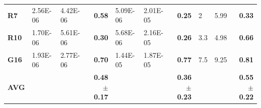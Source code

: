\documentclass[encoding=utf8,british]{tumphthesis}
\begin{document}
\begin{table}[H]
\begin{subtable}{1\textwidth}
{\begin{tabular}{|l|llr|llr|llr|}
\rowcolor[HTML]{CFE2F3} 
\textbf{R7}                               & 2.56E-06                                             & 4.42E-06                                              & \textbf{0.58}                                    & 5.09E-06                                           & 2.01E-05                                              & \textbf{0.25}                                    & 2                                                    & 5.99                                                  & \textbf{0.33}                                    \\
\textbf{R10}                              & 1.70E-06                                             & 5.61E-06                                              & \textbf{0.30}                                    & 5.68E-06                                             & 2.16E-05                                              & \textbf{0.26}                                    & 3.3                                                  & 4.98                                                  & \textbf{0.66}                                    \\
\rowcolor[HTML]{CFE2F3} 
\textbf{G16}                              & 1.93E-06                                             & 2.77E-06                                              & \textbf{0.70}                                    & 1.44E-05                                             & 1.87E-05                                              & \textbf{0.77}                                    & 7.5                                                  & 9.25                                                  & \textbf{0.81}                                    \\ \hline
\textbf{AVG}                             &                                                      &                                                       & \textbf{0.48$\pm$0.17}                           &                                                      &                                                       & \textbf{0.36$\pm$0.23}                           &                                                      &                                                       & \textbf{0.55$\pm$0.22}                          
\\ \hline
\end{tabular}}
\end{subtable}


\end{table}
\end{document}
